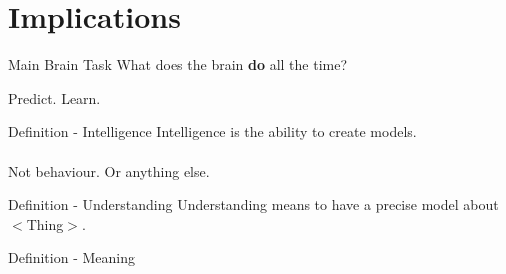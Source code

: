 \section{Implications}


\begin{frame}[c]{Main Brain Task}
    \pause
    \Huge
    What does the brain \textbf{do} \newline all the time?

    \vfill

    \pause
    Predict. \pause Learn.
\end{frame}


\begin{frame}[c]{Definition - Intelligence}
    \Large
    Intelligence \pause is the ability to create models. \\ \\ \pause
    Not behaviour. Or anything else.
\end{frame}

\begin{frame}[c]{Definition - Understanding}
    \Large
    Understanding \pause means to have a precise model about $<$Thing$>$.
\end{frame}

\begin{frame}[c]{Definition - Meaning}
    
\end{frame}

